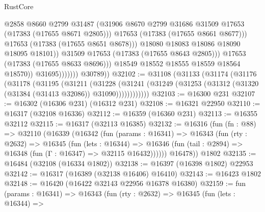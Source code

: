 \begin{lexlean}{RustCore}
\begin{coremodule}
                                      @2858
                                      @8660
                                      @2799
                                      @31487
                                      (@31906
                                        @8670
                                        @2799
                                        @31686
                                        @31509
                                        @17653
                                        (@17383 (@17655 @8671 @2805)))
                                      @17653
                                      (@17383 (@17655 @8661 @8677)))
                                    @17653
                                    (@17383 (@17655 @8651 @8678)))
                                  @18080
                                  @18083
                                  @18086
                                  @18090
                                  @18095
                                  @18101))
                              @31509
                              @17653
                              (@17383 (@17655 @8643 @2805)))
                            @17653
                            (@17383 (@17655 @8633 @8696)))
                          @18549
                          @18552
                          @18555
                          @18559
                          @18564
                          @18570))
                      @31695)))))))
        @30789))
@32102 := @31108
    (@31133
      (@31174
        (@31176
          (@31178
            (@31195
              (@31211
                (@31228
                  (@31241
                    (@31249 (@31253 (@31312 (@31320 (@31384 (@31413 @32086)) @31090))))))))))))
@32103 := @16300 @231
@32107 := @16302 (@16306 @231) (@16312 @231)
@32108 := @16321 @22950
@32110 := @16317 (@32108 @16336)
@32112 := @16359 (@16360 @231)
@32113 := @16355 @32112
@32115 := @16317 (@32113 @16385)
@32132 := @16316
    (fun (fn : @88) =>
    @32110
      (@16339
        (@16342
          (fun (params : @16341) =>
          @16343
            (fun (rty : @2632) =>
            @16345
              (fun (lets : @16344) =>
              @16346 (fun (tail : @2894) => @16348 (fun (Γ : @16347) => @32115 @16432))))))
        @16478))
    @1802
@32135 := @16484 (@32108 (@16334 @1802))
@32138 := @16397 (@16398 @1802) @22953
@32142 := @16317 (@16389 (@32138 @16406) @16410)
@32143 := @16423 @1802
@32148 := @16420 (@16422 @32143 @22956 @16378 @16380)
@32159 := fun (params : @16341) =>
  @16343
    (fun (rty : @2632) =>
    @16345
      (fun (lets : @16344) =>

\end{coremodule}
\end{lexlean}
